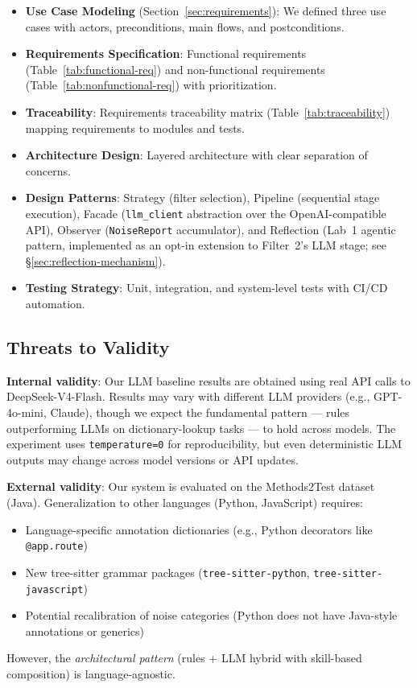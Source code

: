 \documentclass[acmlarge,nonacm,screen]{acmart}
\begin{document}
\begin{itemize}
    \item \textbf{Use Case Modeling} (Section~\ref{sec:requirements}): We defined three use cases with actors, preconditions, main flows, and postconditions.
    \item \textbf{Requirements Specification}: Functional requirements (Table~\ref{tab:functional-req}) and non-functional requirements (Table~\ref{tab:nonfunctional-req}) with prioritization.
    \item \textbf{Traceability}: Requirements traceability matrix (Table~\ref{tab:traceability}) mapping requirements to modules and tests.
    \item \textbf{Architecture Design}: Layered architecture with clear separation of concerns.
    \item \textbf{Design Patterns}: Strategy (filter selection), Pipeline (sequential stage execution), Facade (\texttt{llm\_client} abstraction over the OpenAI-compatible API), Observer (\texttt{NoiseReport} accumulator), and Reflection (Lab~1 agentic pattern, implemented as an opt-in extension to Filter~2's LLM stage; see \S\ref{sec:reflection-mechanism}).
    \item \textbf{Testing Strategy}: Unit, integration, and system-level tests with CI/CD automation.
\end{itemize}

\subsection{Threats to Validity}

\textbf{Internal validity}: Our LLM baseline results are obtained using real API calls to DeepSeek-V4-Flash. Results may vary with different LLM providers (e.g., GPT-4o-mini, Claude), though we expect the fundamental pattern --- rules outperforming LLMs on dictionary-lookup tasks --- to hold across models. The experiment uses \texttt{temperature=0} for reproducibility, but even deterministic LLM outputs may change across model versions or API updates.

\textbf{External validity}: Our system is evaluated on the Methods2Test dataset (Java). Generalization to other languages (Python, JavaScript) requires:
\begin{itemize}
    \item Language-specific annotation dictionaries (e.g., Python decorators like \texttt{@app.route})
    \item New tree-sitter grammar packages (\texttt{tree-sitter-python}, \texttt{tree-sitter-javascript})
    \item Potential recalibration of noise categories (Python does not have Java-style annotations or generics)
\end{itemize}
However, the \textit{architectural pattern} (rules + LLM hybrid with skill-based composition) is language-agnostic.
\end{document}
